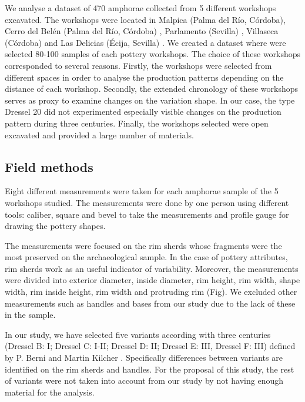 \documentclass[review]{elsarticle}
\begin{document}
We analyse a dataset of 470 amphorae collected from 5 different workshops excavated. The workshops were located in Malpica (Palma del R\'io, C\'ordoba), Cerro del Bel\'en (Palma del R\'io, C\'ordoba) \citep{diaz_trujillo_excavacion_1992}, Parlamento (Sevilla) \citep{garcia_vargas_anforas_2000}, Villaseca (C\'ordoba)\citep{garcia_vargas_enrique_excavacion_????} and Las Delicias (\'Ecija, Sevilla) \citep{fernandez_excavacion_2001,_atelier_2014}. We created a dataset where were selected 80-100 samples of each pottery workshops. The choice of these workshops corresponded to several reasons. Firstly, the workshops were selected from different spaces in order to analyse the production patterns depending on the distance of each workshop. Secondly, the extended chronology of these workshops serves as proxy to examine changes on the variation shape. In our case, the type Dressel 20 did not experimented especially visible changes on the production pattern during three centuries.%
Finally, the workshops selected were open excavated and provided a large number of materials.   


\subsection{Field methods}


Eight different measurements were taken for each amphorae sample of the 5 workshops studied. The measurements were done by one person using different tools: caliber, square and bevel to take the measurements and profile gauge for drawing the pottery shapes. 

The measurements were focused on the rim sherds whose fragments were the most preserved on the archaeological sample. In the case of pottery attributes, rim sherds work as an useful indicator of variability. Moreover, the measurements were divided into exterior diameter, inside diameter, rim height, rim width, shape width, rim inside height, rim width and protruding rim (Fig). We excluded other measurements such as handles and bases from our study due to the lack of these in the sample.    

In our study, we have selected five variants according with three centuries (Dressel B: I; Dressel C: I-II; Dressel D: II; Dressel E: III, Dressel F: III) defined by P. Berni \citep{berni_millet_epigrafianforica_2008} and Martin Kilcher \citep{martin-kilcher_romischen_1994}. Specifically differences between variants are identified on the rim sherds and handles. For the proposal of this study, the rest of variants were not taken into account from our study by not having enough material for the analysis. 
\end{document}
